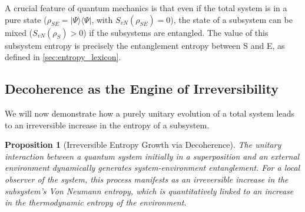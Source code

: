 \documentclass[11pt, letterpaper]{report}
\theoremstyle{plain} %
\newtheorem{proposition}[theorem]{Proposition}
\theoremstyle{definition} %
\theoremstyle{remark} %
\begin{document}
A crucial feature of quantum mechanics is that even if the total system is in a pure state ($\rho_{SE} = |\Psi\rangle\langle\Psi|$, with $S_{vN}(\rho_{SE})=0$), the state of a subsystem can be mixed ($S_{vN}(\rho_S)>0$) if the subsystems are entangled. The value of this subsystem entropy is precisely the entanglement entropy between S and E, as defined in \cref{sec:entropy_lexicon}.

\subsection{Decoherence as the Engine of Irreversibility}
We will now demonstrate how a purely unitary evolution of a total system leads to an irreversible increase in the entropy of a subsystem.

\begin{proposition}[Irreversible Entropy Growth via Decoherence]
\label{prop:decoherence_entropy_growth}
The unitary interaction between a quantum system initially in a superposition and an external environment dynamically generates system-environment entanglement. For a local observer of the system, this process manifests as an irreversible increase in the subsystem's Von Neumann entropy, which is quantitatively linked to an increase in the thermodynamic entropy of the environment.
\end{proposition}
\end{document}
